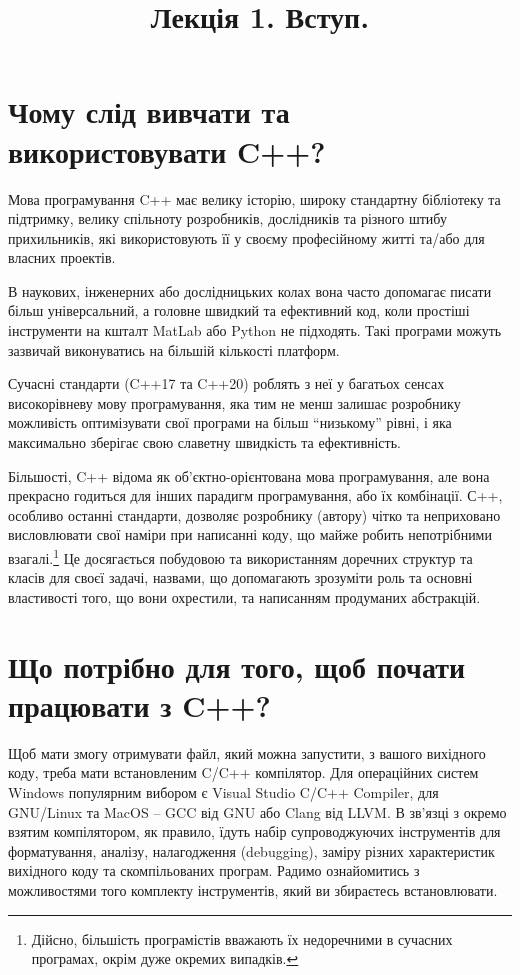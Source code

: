\documentclass[12pt]{article}
\title{Лекція 1. Вступ.}
\begin{document}
	\maketitle
	
	\tableofcontents
	
	\section{Чому слід вивчати та використовувати C++?}

	Мова програмування C++ має велику історію, широку стандартну бібліотеку та підтримку, велику спільноту розробників, дослідників та різного штибу прихильників, які використовують її у своєму професійному житті та/або для власних проектів.

	В наукових, інженерних або дослідницьких колах вона часто допомагає писати більш універсальний, а головне швидкий та ефективний код, коли простіші інструменти на кшталт MatLab або Python не підходять. Такі програми можуть зазвичай виконуватись на більшій кількості платформ.

	Сучасні стандарти (C++17 та C++20) роблять з неї у багатьох сенсах високорівневу мову програмування, яка тим не менш залишає розробнику можливість оптимізувати свої програми на більш ``низькому'' рівні, і яка максимально зберігає свою славетну швидкість та ефективність.

	Більшості, C++ відома як об'єктно-орієнтована мова програмування, але вона прекрасно годиться для інших парадигм програмування, або їх комбінації. С++, особливо останні стандарти, дозволяє розробнику (автору) чітко та неприховано висловлювати свої наміри при написанні коду, що майже робить непотрібними взагалі.\footnote{Дійсно, більшість програмістів вважають їх недоречними в сучасних програмах, окрім дуже окремих випадків.}
	Це досягається побудовою та використанням доречних структур та класів для своєї задачі, назвами, що допомагають зрозуміти роль та основні властивості того, що вони охрестили, та написанням продуманих абстракцій.

	\section{Що потрібно для того, щоб почати працювати з C++?}
	Щоб мати змогу отримувати файл, який можна запустити, з вашого вихідного коду, треба мати встановленим C/C++ компілятор. Для операційних систем Windows популярним вибором є Visual Studio C/C++ Compiler, для GNU/Linux та MacOS -- GCC від GNU або Clang від LLVM. В зв'язці з окремо взятим компілятором, як правило, їдуть набір супроводжуючих інструментів для форматування, аналізу, налагодження (debugging), заміру різних характеристик вихідного коду та скомпільованих програм. Радимо ознайомитись з можливостями того комплекту інструментів, який ви збираєтесь встановлювати.
	
\end{document}
